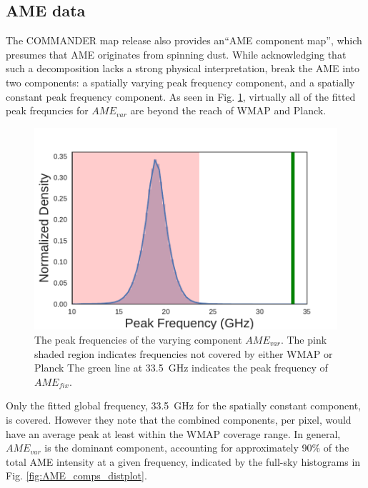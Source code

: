       \subsection{AME data}

          The COMMANDER map release also provides an``AME component map'', which presumes that AME originates from spinning dust. While acknowledging that such a decomposition lacks a strong physical interpretation, \cite{planck15X} break the AME into two components: a spatially varying peak frequency component, and a spatially constant peak frequency component. As seen in Fig. \ref{fig:AME_commander_freqdist}, virtually all of the fitted peak frequncies for $AME_{var}$ are beyond the reach of WMAP and Planck.
          \begin{figure}
            \includegraphics[width=\textwidth]{../Plots/ch_intro/AME_commander_freqdist.pdf}
            \centering
            \caption{The peak frequencies of the varying component $AME_{var}$.  The pink shaded region indicates frequencies not covered by either WMAP or Planck The green line at 33.5~GHz indicates the peak frequency of $AME_{fix}$.}
            \label{fig:AME_commander_freqdist}
          \end{figure}
          Only the fitted global frequency, 33.5~GHz for the spatially constant component, is covered. However they note that the combined components, per pixel, would have an average peak  at least within the WMAP coverage range. In general, $AME_{var}$ is the dominant component, accounting for approximately 90\% of the total AME intensity at a given frequency, indicated by the full-sky histograms in Fig. \ref{fig:AME_comps_distplot}.
